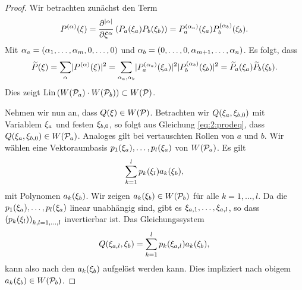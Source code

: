 \begin{proof}
Wir betrachten zunächst den Term
\begin{equation}
P^{(\alpha)}(\xi)
=\frac{\partial^{\lvert\alpha\rvert}}{\partial\xi^\alpha}\left(P_a(\xi_a)P_b(\xi_b)\right)
=P^{(\alpha_a)}_a(\xi_a)P^{(\alpha_b)}_b(\xi_b).
\end{equation}
Mit $\alpha_a=(\alpha_1,\dots,\alpha_m,0,\dots,0)$
und $\alpha_b=(0,\dots,0,\alpha_{m+1},\dots,\alpha_n)$.
Es folgt, dass
\begin{equation}\label{eq:2:prodeq}
\widetilde{P}(\xi)=\sum_\alpha\lvert P^{(\alpha)}(\xi)\rvert^2
=\sum_{\alpha_a,\alpha_b}\lvert P^{(\alpha_a)}_a(\xi_a)\rvert^2\lvert P^{(\alpha_b)}_b(\xi_b)\rvert^2
=\widetilde{P}_a(\xi_a)\widetilde{P}_b(\xi_b).
\end{equation}
Dies zeigt $\operatorname{Lin}\left(W(\mathcal P_a)\cdot W(\mathcal P_b)\right)\subset W(\mathcal P)$.

Nehmen wir nun an, dass $Q(\xi)\in W(\mathcal P)$.
Betrachten wir $Q(\xi_a,\xi_{b,0})$ mit Variablem $\xi_a$ und festen $\xi_{b,0}$,
so folgt aus Gleichung \eqref{eq:2:prodeq},
dass $Q(\xi_a,\xi_{b,0})\in W(\mathcal P_a)$.
Analoges gilt bei vertauschten Rollen von $a$ und $b$.
Wir wählen eine Vektoraumbasis $p_1(\xi_a),\dots,p_l(\xi_a)$ von $W(\mathcal P_a)$.
Es gilt
\begin{equation}
\sum_{k=1}^lp_k(\xi_l)a_k(\xi_b),
\end{equation}
mit Polynomen $a_k(\xi_b)$.
Wir zeigen $a_k(\xi_b)\in W(\mathcal P_b)$ für alle $k=1,\dots,l$.
Da die $p_1(\xi_a),\dots,p_l(\xi_a)$ linear unabhängig sind,
gibt es $\xi_{a,1},\dots,\xi_{a,l}$,
so dass $\left(p_k(\xi_l)\right)_{k,l=1,\dots,l}$ invertierbar ist.
Das Gleichungssystem
\begin{equation}
Q(\xi_{a,l},\xi_b)=\sum_{k=1}^lp_k(\xi_{a,l})a_k(\xi_b),
\end{equation}
kann also nach den $a_k(\xi_b)$ aufgelöst werden kann.
Dies impliziert nach obigem $a_k(\xi_b)\in W(\mathcal P_b)$.

\end{proof}

